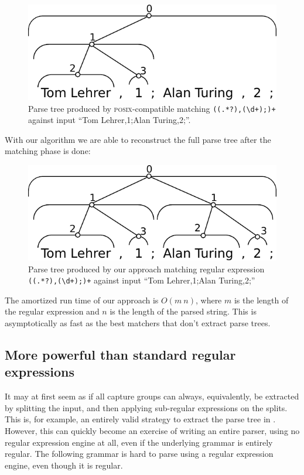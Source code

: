 \documentclass[english]{sigplanconf}
\theoremstyle{definition}
\begin{document}
\begin{figure}[h]
\centering
\includegraphics[width=.75\linewidth]{graphs/posix_parse}
\caption{ Parse tree produced by \textsc{posix}-compatible matching \texttt{((.*?),(\textbackslash d+);)+} against input ``Tom
Lehrer,1;Alan Turing,2;''.}
\end{figure}

With our algorithm we are able to reconstruct the full parse
tree after the matching phase is done:

\begin{figure}[h]
\centering
\includegraphics[width=.75\linewidth]{graphs/full_parse}
\caption{ Parse tree produced by our approach matching regular expression \texttt{((.*?),(\textbackslash d+);)+} against input ``Tom
Lehrer,1;Alan Turing,2;''}
\end{figure}

The amortized run time of our approach is $O(m\: n)$, where $m$
is the length of the regular expression and $n$ is the length of
the parsed string. This is asymptotically as fast as the best matchers
that don't extract parse trees. 

\subsection{More powerful than standard regular expressions}
It may at first seem as if all capture groups can always, equivalently,
be extracted by splitting the input, and then applying sub-regular
expressions on the splits.  This is, for example, an entirely valid
strategy to extract the parse tree in .  However,
this can quickly become an exercise of writing an entire parser,
using no regular expression engine at all, even if the underlying
grammar is entirely regular.  The following grammar is hard to parse
using a regular expression engine, even though it is regular.
\end{document}
